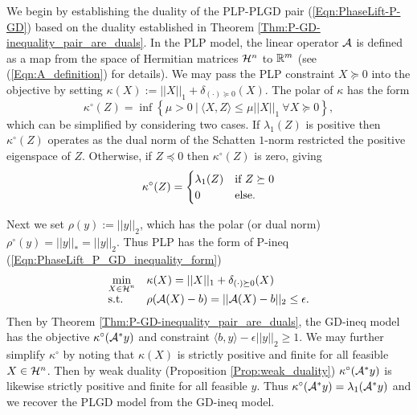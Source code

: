We begin by establishing the duality of the PLP-PLGD pair (\ref{Eqn:PhaseLift-P-GD}) based on the duality established in Theorem \ref{Thm:P-GD-inequality_pair_are_duals}.  In the PLP model, the linear operator ${\mathcal A}$ is defined as a map from the space of Hermitian matrices ${\mathcal H}^n$ to ${\mathbb R}^m$ (see (\ref{Eqn:A_definition}) for details).  We may pass the PLP constraint $X \succeq 0$ into the objective by setting $\kappa(X) := ||X||_1 + \delta_{(\cdot) \succeq 0}(X)$.  The polar of $\kappa$ has the form  
\[
\kappa^\circ(Z) = \inf \left\{ \mu > 0 \ | \ \langle X, Z \rangle \leq \mu ||X||_1 \ \forall X \succeq 0 \right\},
\]
which can be simplified by considering two cases. If $\lambda_1(Z)$ is positive then $\kappa^\circ(Z)$ operates as the dual norm of the Schatten $1$-norm restricted the positive eigenspace of $Z$.  Otherwise, if $Z \preceq 0$ then $\kappa^\circ(Z)$ is zero, giving
\begin{equation}			\label{Eqn:kappa_polar}
\kappa^\circ(Z) = 
	\begin{cases}
		\lambda_1(Z)	&	\textnormal{if } Z \succeq 0	\\
		0	&	\textnormal{else}.
	\end{cases}
\end{equation}

Next we set $\rho(y) := ||y||_2$, which has the polar (or dual norm) $\rho^\circ(y) = ||y||_* = ||y||_2$.  Thus PLP has the form of P-ineq (\ref{Eqn:PhaseLift_P_GD_inequality_form})
\begin{equation*} 			
\begin{array}{ll}
		\min\limits_{\substack{X \in {\mathcal H}^n}}
		&	\kappa(X) = ||X||_1 + \delta_{(\cdot) \succeq 0}(X)
						\\

		\textnormal{s.t.}
		& 	\rho({\mathcal A}(X)-b) = ||{\mathcal A}(X) - b||_2 \leq \epsilon.
\end{array}
\end{equation*}
Then by Theorem \ref{Thm:P-GD-inequality_pair_are_duals}, the GD-ineq model has the objective $\kappa^\circ({\mathcal A}^*y)$ and constraint $\langle b, y \rangle - \epsilon ||y||_2 \geq 1$.  We may further simplify $\kappa^\circ$ by noting that $\kappa(X)$ is strictly positive and finite for all feasible $X \in {\mathcal H}^n$.  Then by weak duality (Proposition \ref{Prop:weak_duality}) $\kappa^\circ({\mathcal A}^*y)$ is likewise strictly positive and finite for all feasible $y$.  Thus $\kappa^\circ({\mathcal A}^*y) = \lambda_1({\mathcal A}^*y)$ and we recover the PLGD model from the GD-ineq model.






